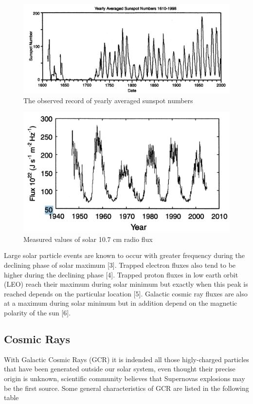 \documentclass[./dissertation.tex]{subfiles}
\begin{document}
\begin{figure}[h!]
\centering
  \includegraphics[scale = 0.50]{imgs/sunspot.PNG}
  \caption{The observed record of yearly averaged sunspot numbers \cite{bib2}}
  \label{fig:magnetosphere}
\end{figure}
\begin{figure}[h!]
\centering
  \includegraphics[scale = 0.50]{imgs/F10sun.PNG}
  \caption{Measured values of solar 10.7 cm radio flux \cite{bib2}}
  \label{fig:magnetosphere}
\end{figure}

Large solar particle events  are known to occur  with greater    frequency   during   the    declining   phase of solar maximum [3]. Trapped  electron  fluxes  also  tend to be  higher during the declining  phase [4]. Trapped proton  fluxes in  low earth  orbit (LEO) reach their  maximum during solar minimum but exactly when this peak is reached depends on the particular location [5]. Galactic cosmic ray fluxes are also at a maximum during  solar minimum but  in addition  depend  on the magnetic polarity of the sun [6]. 

\newpage

\subsection{Cosmic Rays}
With Galactic Cosmic Rays (GCR) it is indended all those higly-charged particles that have been generated outside our solar system, even thought their precise origin  is unknown, scientific community believes that Supernovas explosions may be the first source. Some general characteristics of GCR are listed in the following table
\end{document}
